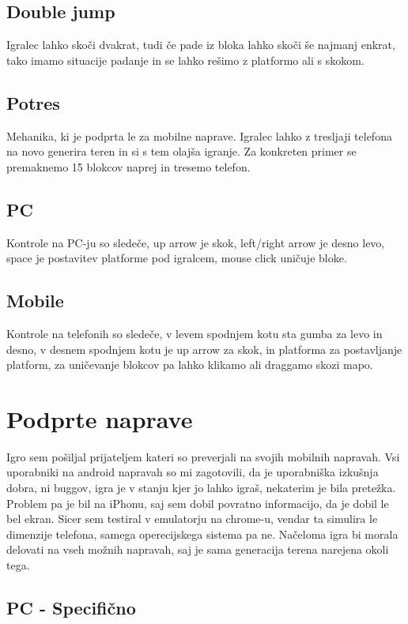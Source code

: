 \documentclass[a4paper,11pt]{article}
\begin{document}
\subsection{Double jump}
Igralec lahko skoči dvakrat, tudi če pade iz bloka lahko skoči še najmanj enkrat, tako imamo situacije padanje in se lahko rešimo z platformo ali s skokom.

\subsection{Potres}
Mehanika, ki je podprta le za mobilne naprave. Igralec lahko z tresljaji telefona na novo generira teren in si s tem olajša igranje. Za konkreten primer se premaknemo 15 blokcov naprej in tresemo telefon.

\subsection{PC}
Kontrole na PC-ju so sledeče, up arrow je skok, left/right arrow je desno levo, space je postavitev platforme pod igralcem, mouse click uničuje bloke.

\subsection{Mobile}
Kontrole na telefonih so sledeče, v levem spodnjem kotu sta gumba za levo in desno, v desnem spodnjem kotu je up arrow za skok, in platforma za postavljanje platform, za uničevanje blokcov pa lahko klikamo ali draggamo skozi mapo.

\section{Podprte naprave}

Igro sem pošiljal prijateljem kateri so preverjali na svojih mobilnih napravah. Vsi uporabniki na android napravah so mi zagotovili, da je uporabniška izkušnja dobra, ni buggov, igra je v stanju kjer jo lahko igraš, nekaterim je bila pretežka. Problem pa je bil na iPhonu, saj sem dobil povratno informacijo, da je dobil le bel ekran. Sicer sem testiral v emulatorju na chrome-u, vendar ta simulira le dimenzije telefona, samega operecijskega sistema pa ne. Načeloma igra bi morala delovati na vseh možnih napravah, saj je sama generacija terena narejena okoli tega.

\subsection{PC - Specifično}
\end{document}
